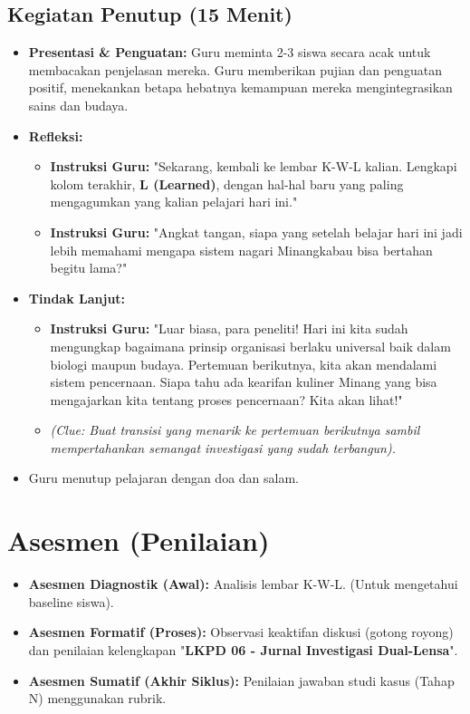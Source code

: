 \documentclass[a4paper,12pt]{article}
\begin{document}
\subsection{Kegiatan Penutup (15 Menit)}
\begin{itemize}
\item \textbf{Presentasi \& Penguatan:} Guru meminta 2-3 siswa secara acak untuk membacakan penjelasan mereka. Guru memberikan pujian dan penguatan positif, menekankan betapa hebatnya kemampuan mereka mengintegrasikan sains dan budaya.
\item \textbf{Refleksi:}
    \begin{itemize}
    \item \textbf{Instruksi Guru:} "Sekarang, kembali ke lembar K-W-L kalian. Lengkapi kolom terakhir, \textbf{L (Learned)}, dengan hal-hal baru yang paling mengagumkan yang kalian pelajari hari ini."
    \item \textbf{Instruksi Guru:} "Angkat tangan, siapa yang setelah belajar hari ini jadi lebih memahami mengapa sistem nagari Minangkabau bisa bertahan begitu lama?"
    \end{itemize}
\item \textbf{Tindak Lanjut:}
    \begin{itemize}
    \item \textbf{Instruksi Guru:} "Luar biasa, para peneliti! Hari ini kita sudah mengungkap bagaimana prinsip organisasi berlaku universal baik dalam biologi maupun budaya. Pertemuan berikutnya, kita akan mendalami sistem pencernaan. Siapa tahu ada kearifan kuliner Minang yang bisa mengajarkan kita tentang proses pencernaan? Kita akan lihat!"
    \item \textit{(Clue: Buat transisi yang menarik ke pertemuan berikutnya sambil mempertahankan semangat investigasi yang sudah terbangun).}
    \end{itemize}
\item Guru menutup pelajaran dengan doa dan salam.
\end{itemize}

\section{Asesmen (Penilaian)}

\begin{itemize}
\item \textbf{Asesmen Diagnostik (Awal):} Analisis lembar K-W-L. (Untuk mengetahui baseline siswa).
\item \textbf{Asesmen Formatif (Proses):} Observasi keaktifan diskusi (gotong royong) dan penilaian kelengkapan "\textbf{LKPD 06 - Jurnal Investigasi Dual-Lensa}".
\item \textbf{Asesmen Sumatif (Akhir Siklus):} Penilaian jawaban studi kasus (Tahap N) menggunakan rubrik.
\end{itemize}
\end{document}

